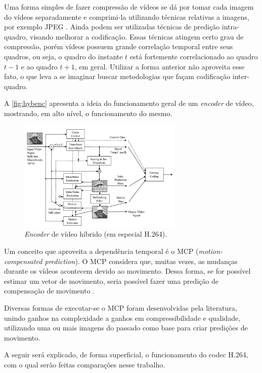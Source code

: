 \documentclass[cic,tc]{iiufrgs}
\begin{document}
Uma forma simples de fazer compressão de vídeos se dá por tomar cada imagem do vídeos
separadamente e comprimi-la utilizando técnicas relativas a imagens, por exemplo JPEG \cite{SullivanH264}.
Ainda podem ser utilizadas técnicas de predição intra-quadro, visando melhorar a codificação.
Essas técnicas atingem certo grau de compressão, porém vídeos possuem grande correlação temporal
entre seus quadros, ou seja, o quadro do instante $t$ está fortemente correlacionado ao quadro $t-1$ e
ao quadro $t+1$, em geral.
Utilizar a forma anterior não aproveita esse fato, o que leva a se imaginar buscar metodologias
que façam codificação inter-quadro.

A \autoref{fig:hybenc} apresenta a ideia do funcionamento geral de um \textit{encoder} de vídeo,
mostrando, em alto nível, o funcionamento do mesmo.
\begin{figure}[H]
    \label{fig:hybenc}
    \caption{\textit{Encoder} de vídeo híbrido (em especial H.264).}
    \begin{center}
        \includegraphics[width=0.7\textwidth]{img/HybridCodec.png}
    \end{center}
\end{figure}

Um conceito que aproveita a dependência temporal é o MCP (\textit{motion-compensated prediction}).
O MCP considera que, muitas vezes, as mudanças durante os vídeos acontecem devido ao movimento.
Dessa forma, se for possível estimar um vetor de movimento, seria possível fazer uma predição
de compensação de movimento \cite{SullivanH264}. 

Diversas formas de executar-se o MCP foram desenvolvidas pela literatura, unindo ganhos
na complexidade a ganhos em compressibilidade e qualidade, utilizando uma ou mais imagens 
do passado como base para criar predições de movimento.

A seguir será explicado, de forma superficial, o funcionamento do codec H.264, com o qual 
serão feitas comparações nesse trabalho.
\end{document}
